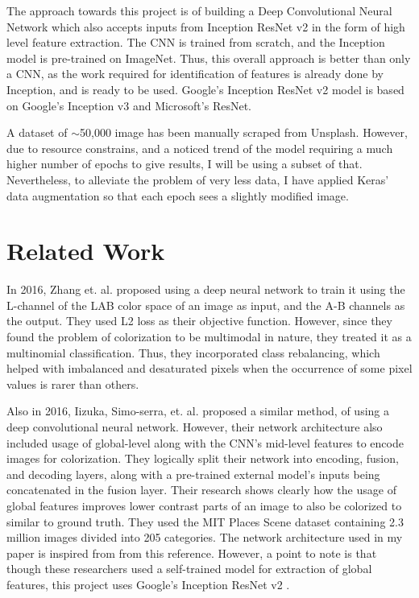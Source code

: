 \documentclass[10pt,twocolumn,letterpaper]{article}
\begin{document}
	The approach towards this project is of building a Deep Convolutional Neural Network which also accepts inputs from Inception ResNet v2 in the form of high level feature extraction. The CNN is trained from scratch, and the Inception model is pre-trained on ImageNet. Thus, this overall approach is better than only a CNN, as the work required for identification of features is already done by Inception, and is ready to be used. Google's Inception ResNet v2 model is based on Google's Inception v3 and Microsoft's ResNet.

	A dataset of $\sim$50,000 image has been manually scraped from Unsplash. However, due to resource constrains, and a noticed trend of the model requiring a much higher number of epochs to give results, I will be using a subset of that. Nevertheless, to alleviate the problem of very less data, I have applied Keras' data augmentation so that each epoch sees a slightly modified image.

	\section{Related Work}
	In 2016, Zhang et. al. \cite{Zhang1} proposed using a deep neural network to train it using the L-channel of the LAB color space \cite{LabColorSpace} of an image as input, and the A-B channels as the output. They used L2 loss as their objective function. However, since they found the problem of colorization to be multimodal in nature, they treated it as a multinomial classification. Thus, they incorporated class rebalancing, which helped with imbalanced and desaturated pixels when the occurrence of some pixel values is rarer than others.

	Also in 2016, Iizuka, Simo-serra, et. al. \cite{Iizuka} proposed a similar method, of using a deep convolutional neural network. However, their network architecture also included usage of global-level along with the CNN's mid-level features to encode images for colorization. They logically split their network into encoding, fusion, and decoding layers, along with a pre-trained external model's inputs being concatenated in the fusion layer. Their research shows clearly how the usage of global features improves lower contrast parts of an image to also be colorized to similar to ground truth. They used the MIT Places Scene dataset containing 2.3 million images divided into 205 categories. The network architecture used in my paper is inspired from from this reference. However, a point to note is that though these researchers used a self-trained model for extraction of global features, this project uses Google's Inception ResNet v2 \cite{Inception}.
\end{document}
